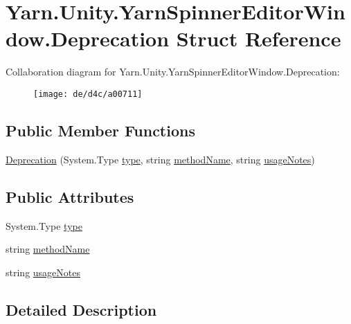 \hypertarget{a00070}{\section{Yarn.\-Unity.\-Yarn\-Spinner\-Editor\-Window.\-Deprecation Struct Reference}
\label{a00070}
}


Collaboration diagram for Yarn.\-Unity.\-Yarn\-Spinner\-Editor\-Window.\-Deprecation\-:
\nopagebreak
\begin{figure}[H]
\begin{center}
\leavevmode
\texttt{[image: de/d4c/a00711]}
\end{center}
\end{figure}
\subsection*{Public Member Functions}
\begin{DoxyCompactItemize}
\item 
\hyperlink{a00070_ae80171841e97a48611c51a9a574a2fc0}{Deprecation} (System.\-Type \hyperlink{a00070_a750904df254223bf3131c39017f90a0b}{type}, string \hyperlink{a00070_a61605b2d0a17dfdf9c62952270d44fbd}{method\-Name}, string \hyperlink{a00070_ac23509be7ae6b43a3e2154dd430954a7}{usage\-Notes})
\end{DoxyCompactItemize}
\subsection*{Public Attributes}
\begin{DoxyCompactItemize}
\item 
System.\-Type \hyperlink{a00070_a750904df254223bf3131c39017f90a0b}{type}
\item 
string \hyperlink{a00070_a61605b2d0a17dfdf9c62952270d44fbd}{method\-Name}
\item 
string \hyperlink{a00070_ac23509be7ae6b43a3e2154dd430954a7}{usage\-Notes}
\end{DoxyCompactItemize}


\subsection{Detailed Description}


